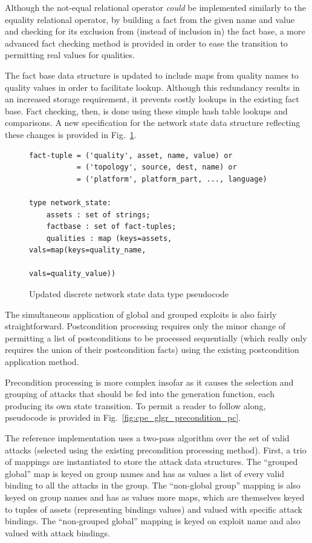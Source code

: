 Although the not-equal relational operator \emph{could} be implemented
similarly to the equality relational operator, by building a fact from the
given name and value and checking for its exclusion from (instead of inclusion 
in) the fact base, a more advanced fact checking method is provided in order 
to ease the transition to permitting real values for qualities.

The fact base data structure is updated to include maps from quality names to
quality values in order to facilitate lookup. Although this redundancy results 
in an increased storage requirement, it prevents costly lookups in the existing
fact base. Fact checking, then, is done using these simple hash
table lookups and comparisons. A new specification for the network state
data structure reflecting these changes is provided in 
Fig.~\ref{fig:netstate_map_pc}.

\begin{figure}
\begin{lstlisting}
fact-tuple = ('quality', asset, name, value) or
           = ('topology', source, dest, name) or
           = ('platform', platform_part, ..., language)

type network_state:
    assets : set of strings;
    factbase : set of fact-tuples;
    qualities : map (keys=assets, vals=map(keys=quality_name,
                                           vals=quality_value))
\end{lstlisting}
\caption{Updated discrete network state data type pseudocode}
\label{fig:netstate_map_pc}
\end{figure}

The simultaneous application of global and grouped exploits is also
fairly straightforward. Postcondition processing requires only the minor change
of permitting a list of postconditions to be processed sequentially (which
really only requires the union of their postcondition facts) using the
existing postcondition application method.

Precondition processing is more complex insofar as it causes the selection and
grouping of attacks that should be fed into the generation function,
each producing its own state transition. To permit
a reader to follow along, pseudocode is provided in 
Fig.~\ref{fig:cpe_glgr_precondition_pc}.

The reference implementation uses a two-pass algorithm over the set of
valid attacks (selected using the existing precondition processing method).
First, a trio of mappings are instantiated to store the attack data structures.
The ``grouped global'' map is keyed on group names and has as values a list of every
valid binding to all the attacks in the group.
The ``non-global group'' mapping is also keyed on group names and has as values more maps, which are
themselves keyed to tuples of assets (representing bindings values) and valued
with specific attack bindings. The ``non-grouped global'' mapping is keyed on exploit name
and also valued with attack bindings.

